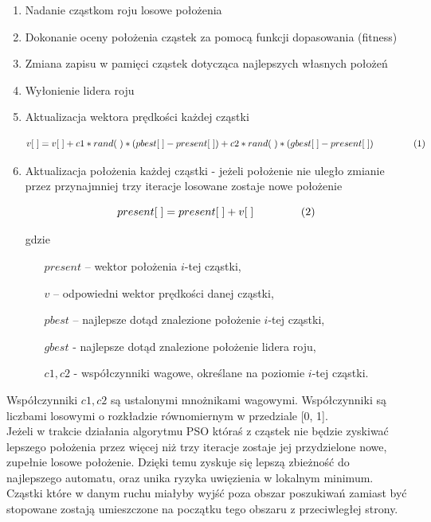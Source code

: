 \documentclass[runningheads,a4paper]{llncs}
\begin{document}
\begin{enumerate}
\item Nadanie cząstkom roju losowe położenia
\item Dokonanie oceny położenia cząstek za pomocą funkcji dopasowania (fitness)
\item Zmiana zapisu w pamięci cząstek dotycząca najlepszych własnych położeń
\item Wyłonienie lidera roju
\item Aktualizacja wektora prędkości każdej cząstki

\begin{displaymath}
v[\;] = v[\;] + c1 * rand(\;) * (pbest[\;] - present[\;]) + c2 * rand(\;) * (gbest[\;] - present[\;]) \hspace{15mm} (1)
\end{displaymath}

\item Aktualizacja położenia każdej cząstki - jeżeli położenie nie uległo zmianie przez przynajmniej trzy iteracje losowane zostaje nowe położenie

\begin{displaymath}
present[\;] = present[\;] + v[\;] \hspace{15mm} (2)
\end{displaymath}

gdzie

\begin{itemize}
\item[$present$] -- wektor położenia $i$-tej cząstki,
\item[$v$] -- odpowiedni wektor prędkości danej cząstki,
\item[$pbest$] -- najlepsze dotąd znalezione położenie $i$-tej cząstki,
\item[$gbest$] - najlepsze dotąd znalezione położenie lidera roju,
\item[$c1, c2$] - współczynniki wagowe, określane na poziomie $i$-tej cząstki.
\end{itemize}
\end{enumerate}

Współczynniki $c1, c2$ są ustalonymi mnożnikami wagowymi. Współczynniki  są liczbami losowymi o rozkładzie równomiernym w przedziale [0, 1]. \\

Jeżeli w trakcie działania algorytmu PSO któraś z cząstek nie będzie zyskiwać lepszego położenia przez więcej niż trzy iteracje zostaje jej przydzielone nowe, zupełnie losowe położenie. Dzięki temu zyskuje się lepszą zbieżność do najlepszego automatu, oraz unika ryzyka uwięzienia w lokalnym minimum. Cząstki które w danym ruchu miałyby wyjść poza obszar poszukiwań zamiast być stopowane zostają umieszczone na początku tego obszaru z przeciwległej strony. \\
\end{document}
